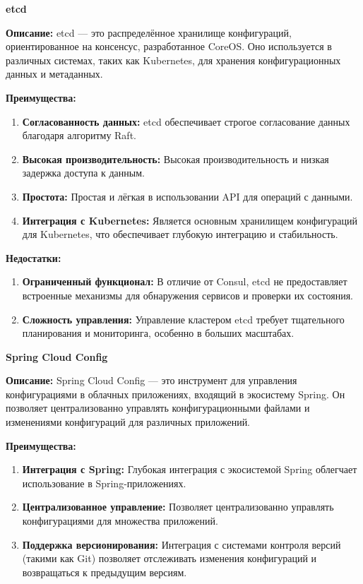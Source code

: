 \textbf{etcd}

\textbf{Описание:} etcd — это распределённое хранилище конфигураций, ориентированное на консенсус, разработанное CoreOS. Оно используется в различных системах, таких как Kubernetes, для хранения конфигурационных данных и метаданных.

\textbf{Преимущества:}
\begin{enumerate}[label=\arabic*.]
    \item \textbf{Согласованность данных:} etcd обеспечивает строгое согласование данных благодаря алгоритму Raft.
    \item \textbf{Высокая производительность:} Высокая производительность и низкая задержка доступа к данным.
    \item \textbf{Простота:} Простая и лёгкая в использовании API для операций с данными.
    \item \textbf{Интеграция с Kubernetes:} Является основным хранилищем конфигураций для Kubernetes, что обеспечивает глубокую интеграцию и стабильность.
\end{enumerate}

\textbf{Недостатки:}
\begin{enumerate}[label=\arabic*.]
    \item \textbf{Ограниченный функционал:} В отличие от Consul, etcd не предоставляет встроенные механизмы для обнаружения сервисов и проверки их состояния.
    \item \textbf{Сложность управления:} Управление кластером etcd требует тщательного планирования и мониторинга, особенно в больших масштабах.
\end{enumerate}

\textbf{Spring Cloud Config}

\textbf{Описание:} Spring Cloud Config — это инструмент для управления конфигурациями в облачных приложениях, входящий в экосистему Spring.
Он позволяет централизованно управлять конфигурационными файлами и изменениями конфигураций для различных приложений.

\textbf{Преимущества:}
\begin{enumerate}[label=\arabic*.]
    \item \textbf{Интеграция с Spring:} Глубокая интеграция с экосистемой Spring облегчает использование в Spring-приложениях.
    \item \textbf{Централизованное управление:} Позволяет централизованно управлять конфигурациями для множества приложений.
    \item \textbf{Поддержка версионирования:} Интеграция с системами контроля версий (такими как Git) позволяет отслеживать изменения конфигураций и возвращаться к предыдущим версиям.
\end{enumerate}


